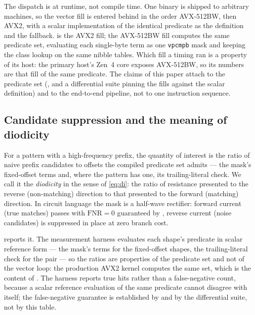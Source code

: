 \documentclass[11pt,letterpaper]{article}
\begin{document}
The dispatch is at runtime, not compile time. One binary is shipped to
arbitrary machines, so the vector fill is entered behind
 in the order AVX-512BW, then AVX2, with a
scalar implementation of the identical predicate as the definition and the
fallback.  is the AVX2 fill; the AVX-512BW fill computes
the same predicate set, evaluating each single-byte term as one
\texttt{vpcmpb} mask and keeping the class lookup on the same nibble
tables. Which fill a timing ran is a property of its host: the primary
host's Zen~4 core exposes AVX-512BW, so its numbers are that fill of the
same predicate. The claims of this paper attach to the predicate set
(, and a differential suite pinning the fills against the
scalar definition) and to the end-to-end pipeline, not to one instruction
sequence.

\subsection{Candidate suppression and the meaning of diodicity}
\label{sec:dio}
For a pattern with a high-frequency prefix, the quantity of interest is the
ratio of naive prefix candidates to offsets the compiled predicate set
admits --- the mask's fixed-offset terms and, where the pattern has one,
its trailing-literal check. We call
it the \emph{diodicity} in the sense of \eqref{eq:di}: the ratio of
resistance presented to the reverse (non-matching) direction to that
presented to the forward (matching) direction. In circuit language the mask
is a half-wave rectifier: forward current (true matches) passes with
$\mathrm{FNR}=0$ guaranteed by , reverse current (noise
candidates) is suppressed in place at zero branch cost.

 reports it. The measurement harness evaluates each shape's
predicate in scalar reference form --- the mask's terms for the fixed-offset
shapes, the trailing-literal check for the pair --- so the ratios are
properties of the predicate set and not of the vector loop: the production
AVX2 kernel computes the same set, which is the content of
. The harness reports true hits rather than a false-negative
count, because a scalar reference evaluation of the same predicate cannot
disagree with itself; the false-negative guarantee is established by
 and by the differential suite, not by this table.
\end{document}
